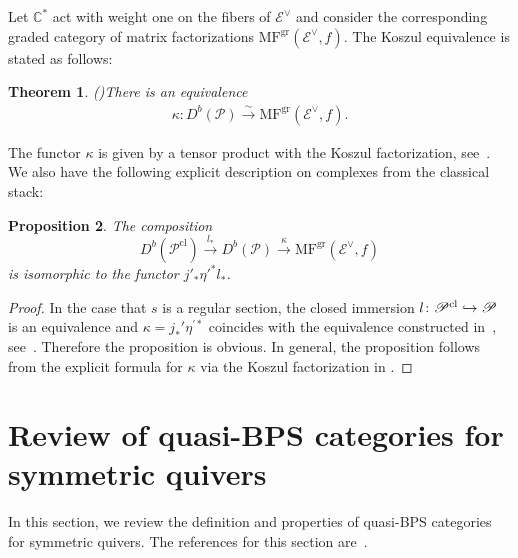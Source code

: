 \documentclass [11pt,oneside,a4paper,mathscr]{amsart}
\makeatletter
\newtheorem{thm}{Theorem}[section]
\newtheorem{prop}[thm]{Proposition}
\theoremstyle{definition}
\newcommand{\X}{\mathscr{X}}
\newcommand{\inclusion}{\ar@<-0.3ex>@{^{(}->}[r]}
\newcommand{\linclusion}{\ar@<-0.3ex>@{^{(}->}[rr]}
\makeatother
\begin{document}
Let $\mathbb{C}^*$ act with weight one on the fibers of $\mathscr{E}^{\vee}$ and consider the corresponding graded category of matrix factorizations $\mathrm{MF}^{\mathrm{gr}}(\mathscr{E}^{\vee}, f)$.
The Koszul equivalence is stated 
as follows: 
\begin{thm}\emph{(\cite{I, Hirano, T})}\label{thm:Koszul}
There is an equivalence 
\begin{align}\label{Koszul}
\kappa \colon D^b(\mathscr{P})\xrightarrow{\sim} \mathrm{MF}^{\mathrm{gr}}(\mathscr{E}^{\vee}, f).
\end{align}
\end{thm}
The functor $\kappa$ 
is given by a tensor product with 
the Koszul factorization, see~\cite[Section~2.3.2]{T}. 
We also have the following explicit description on complexes from the classical stack: 
\begin{prop}\label{prop511}
    The composition 
    \[D^b(\mathscr{P}^{\mathrm{cl}})\stackrel{l_{\ast}}{\to} D^b(\mathscr{P})\xrightarrow{\kappa} \mathrm{MF}^{\mathrm{gr}}(\mathscr{E}^{\vee}, f)\] is isomorphic to the functor $j'_*\eta'^*l_*$. 
    \end{prop}
\begin{proof}
In the case that $s$ is a regular section, 
the closed immersion $l \colon \mathscr{P}^{\rm{cl}} \hookrightarrow \mathscr{P}$ is an equivalence 
and $\kappa=j_{\ast}'\eta^{'\ast}$ 
coincides with the equivalence constructed in~\cite{Hirano}, 
see~\cite[Remark~2.3.5]{T}. 
Therefore the proposition is obvious. 
In general, the proposition follows from 
the explicit formula 
for $\kappa$ via the Koszul factorization
in \cite[Section 2.3.2]{T}.
\end{proof}


\section{Review of quasi-BPS categories for symmetric quivers}\label{sec:quivers}
In this section, we review the definition and properties of 
quasi-BPS categories for symmetric quivers. 
The references for this section are~\cite{P0, P, PTzero, PTquiver}. 
\end{document}
